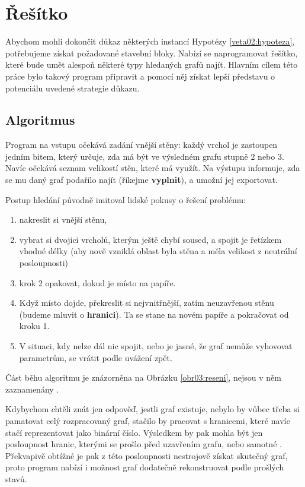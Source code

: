 
\chapter{Řešítko} \label{resitko}
Abychom mohli dokončit důkaz některých instancí Hypotézy \ref{veta02:hypoteza}, potřebujeme získat požadované stavební bloky. Nabízí se naprogramovat řešítko, které bude umět alespoň některé typy hledaných grafů najít. Hlavním cílem této práce bylo takový program připravit a pomocí něj získat lepší představu o potenciálu uvedené strategie důkazu.

\section{Algoritmus}

Program na vstupu očekává zadání vnější stěny: každý vrchol je zastoupen jedním bitem, který určuje, zda má být ve výsledném grafu stupně 2 nebo 3. Navíc očekává seznam velikostí stěn, které má využít. Na výstupu informuje, zda se mu daný graf podařilo najít (říkejme \textbf{vyplnit}), a umožní jej exportovat.

Postup hledání původně imitoval lidské pokusy o řešení problému: 

\begin{enumerate}
\item nakreslit si vnější stěnu,
\item vybrat si dvojici vrcholů, kterým ještě chybí soused, a spojit je řetízkem vhodné délky (aby nově vzniklá oblast byla stěna a měla velikost z neutrální posloupnosti)
\item krok 2 opakovat, dokud je místo na papíře.
\item Když místo dojde, překreslit si nejvnitřnější, zatím neuzavřenou stěnu (budeme mluvit o \textbf{hranici}). Ta se stane  na novém papíře a pokračovat od kroku 1.
\item V situaci, kdy nelze dál nic spojit, nebo je jasné, že graf nemůže vyhovovat parametrům, se vrátit podle uvážení zpět.
\end{enumerate}

Část běhu algoritmu je znázorněna na Obrázku \ref{obr03:reseni}, nejsou v něm zaznamenány .

Kdybychom chtěli znát jen  odpověď, jestli graf existuje, nebylo by vůbec třeba si pamatovat celý rozpracovaný graf, stačilo by pracovat s hranicemi, které navíc stačí reprezentovat jako binární číslo. Výsledkem by pak mohla být jen posloupnost hranic, kterými se prošlo před uzavřením grafu, nebo samotné . Překvapivě obtížné je pak z této posloupnosti nestrojově získat skutečný graf, proto program nabízí i možnost graf dodatečně rekonstruovat podle prošlých stavů.

